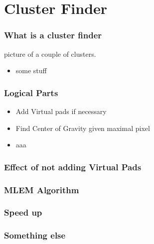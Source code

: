 \documentclass{beamer}
\begin{document}
\section{Cluster Finder}

\begin{frame}
\frametitle{What is a cluster finder} 
picture of a couple of clusters.
\begin{itemize}
\item some stuff

\end{itemize}
\end{frame}

\begin{frame}
  \frametitle{Logical Parts}
  \begin{itemize}
    \item Add Virtual pads if necessary  
    \item Find Center of Gravity given maximal pixel
      \item aaa
  \end{itemize}
\end{frame}

\begin{frame}
  \frametitle{Effect of not adding Virtual Pads}

\end{frame}

\begin{frame}
  \frametitle{MLEM Algorithm}
\end{frame}

\begin{frame}
  \frametitle{Speed up}
\end{frame}

\begin{frame}
\frametitle{Something else}
\end{frame}
\end{document}
